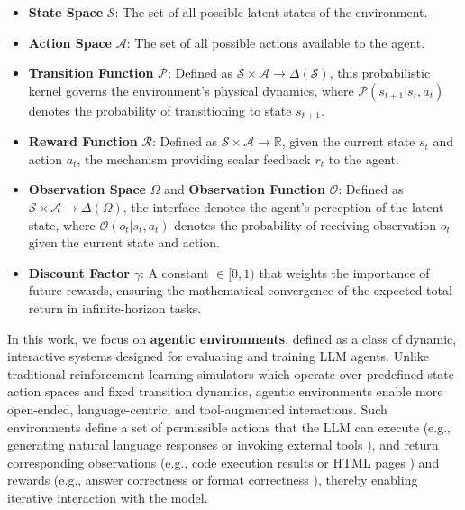 \documentclass{llmxive}
\begin{document}
\begin{itemize}
    \item \textbf{State Space} $\mathcal{S}$: The set of all possible latent states of the environment.
    \item \textbf{Action Space} $\mathcal{A}$: The set of all possible actions available to the agent.
    \item \textbf{Transition Function} $\mathcal{P}$: Defined as $\mathcal{S} \times \mathcal{A} \rightarrow \Delta(\mathcal{S})$, this probabilistic kernel governs the environment's physical dynamics, where $\mathcal{P}(s_{t+1} | s_t, a_t)$ denotes the probability of transitioning to state $s_{t+1}$.
    \item \textbf{Reward Function} $\mathcal{R}$: Defined as $\mathcal{S} \times \mathcal{A} \rightarrow \mathbb{R}$, given the current state $s_t$ and action $a_t$, the mechanism providing scalar feedback $r_t$ to the agent.
    \item \textbf{Observation Space} $\Omega$ and \textbf{Observation Function} $\mathcal{O}$: Defined as $\mathcal{S} \times \mathcal{A} \rightarrow \Delta(\Omega)$, the interface denotes the agent's perception of the latent state, where $\mathcal{O}(o_t | s_t, a_t)$ denotes the probability of receiving observation $o_t$ given the current state and action.
    \item  \textbf{Discount Factor} $\gamma$: A constant $\in [0, 1)$ that weights the importance of future rewards, ensuring the mathematical convergence of the expected total return in infinite-horizon tasks.
\end{itemize}
In this work, we focus on \textbf{agentic environments}, defined as a class of dynamic, interactive systems designed for evaluating and training LLM agents. 
Unlike traditional reinforcement learning simulators which operate over predefined state-action spaces and fixed transition dynamics, agentic environments enable more open-ended, language-centric, and tool-augmented interactions.
Such environments define a set of permissible actions that the LLM can execute (e.g., generating natural language responses \cite{ALFWorld, MLE-bench, Openai_gym} or invoking external tools \cite{ToolACE, Toolformer, ToolRL}), and return corresponding observations (e.g., code execution results \cite{SWE-Bench,Terminal-Bench, LiveCodeBench} or HTML pages \cite{WebShop, WebArena, WebVoyager}) and rewards (e.g., answer correctness or format correctness \cite{LLMARENA, HLE, GAIA}), thereby enabling iterative interaction with the model.
\end{document}
